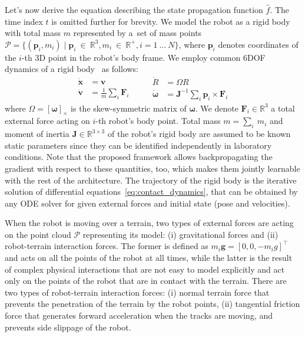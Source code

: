 Let's now derive the equation describing the state propagation function $\hat{f}$.
The time index $t$ is omitted further for brevity.
We model the robot as a rigid body with total mass $m$ represented by a~set of mass points
$\mathcal{P} = \{(\mathbf{p}_i, m_i)\; | \; \mathbf{p}_i~\in~\mathbb{R}^3, m_i~\in~\mathbb{R}^+, i=1~\dots~N\}$,
where $\mathbf{p}_i$ denotes coordinates of the $i$-th 3D point in the robot's body frame.
We employ common 6DOF dynamics of a rigid body~\cite{contact_dynamics-2018} as follows:
\begin{equation}
  \begin{split}
    \dot{\mathbf{x}} &= \mathbf{v}\\
    \dot{\mathbf{v}} &= \frac{1}{m}\sum_i\mathbf{F}_i
  \end{split}
  \quad\quad
  \begin{split}
    \dot{R} &= \Omega R\\
    \dot{\boldsymbol{\omega}} &= \mathbf{J}^{-1}\sum_i \mathbf{p}_i\times\mathbf{F}_i
  \end{split}
  \label{eq:contact_dynamics}
\end{equation}
where $\Omega = [\boldsymbol{\omega}]_{\times}$ is the skew-symmetric matrix of $\boldsymbol{\omega}$.
We denote $\mathbf{F}_i\in\mathbb{R}^3$ a total external force acting on $i$-th robot's body point.
Total mass $m = \sum_i~m_i$ and moment of inertia $\mathbf{J}\in\mathbb{R}^{3\times 3}$ of the robot's rigid body are assumed to be known
static parameters since they can be identified independently in laboratory conditions.
Note that the proposed framework allows backpropagating the gradient with respect to these quantities, too,
which makes them jointly learnable with the rest of the architecture.
The trajectory of the rigid body is the iterative solution of differential equations~\eqref{eq:contact_dynamics},
that can be obtained by any ODE solver for given external forces and initial state (pose and velocities).

When the robot is moving over a terrain, two types of external forces are acting
on the point cloud $\mathcal{P}$ representing its model:
(i) gravitational forces and (ii) robot-terrain interaction forces.
The former is defined as $m_i\mathbf{g} = [0, 0, -m_ig]^\top$ and acts on
all the points of the robot at all times,
while the latter is the result of complex physical interactions that are not easy
to model explicitly and act only on the points of the robot that are in contact
with the terrain.
There are two types of robot-terrain interaction forces:
(i) normal terrain force that prevents the penetration of the terrain by the robot points,
(ii) tangential friction force that generates forward acceleration when the tracks are moving,
and prevents side slippage of the robot.

